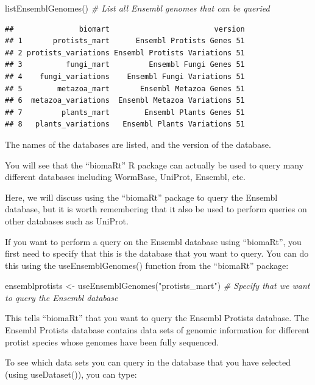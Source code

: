 \documentclass[
]{book}
\newenvironment{Shaded}{\begin{snugshade}}{\end{snugshade}}
\newcommand{\CommentTok}[1]{\textcolor[rgb]{0.56,0.35,0.01}{\textit{#1}}}
\newcommand{\FunctionTok}[1]{\textcolor[rgb]{0.00,0.00,0.00}{#1}}
\newcommand{\NormalTok}[1]{#1}
\newcommand{\OtherTok}[1]{\textcolor[rgb]{0.56,0.35,0.01}{#1}}
\newcommand{\StringTok}[1]{\textcolor[rgb]{0.31,0.60,0.02}{#1}}
\begin{document}
\begin{Shaded}
\begin{Highlighting}[]
\FunctionTok{listEnsemblGenomes}\NormalTok{()        }\CommentTok{\# List all Ensembl genomes that can be queried}
\end{Highlighting}
\end{Shaded}

\begin{verbatim}
##               biomart                        version
## 1       protists_mart      Ensembl Protists Genes 51
## 2 protists_variations Ensembl Protists Variations 51
## 3          fungi_mart         Ensembl Fungi Genes 51
## 4    fungi_variations    Ensembl Fungi Variations 51
## 5        metazoa_mart       Ensembl Metazoa Genes 51
## 6  metazoa_variations  Ensembl Metazoa Variations 51
## 7         plants_mart        Ensembl Plants Genes 51
## 8   plants_variations   Ensembl Plants Variations 51
\end{verbatim}

The names of the databases are listed, and the version of the database.

You will see that the ``biomaRt'' R package can actually be used to query many different databases including WormBase, UniProt, Ensembl, etc.

Here, we will discuss using the ``biomaRt'' package to query the Ensembl database, but it is worth remembering that it also be used to perform queries on other databases such as UniProt.

If you want to perform a query on the Ensembl database using ``biomaRt'', you first need to specify that this is the database that you want to query. You can do this using the useEnsemblGenomes() function from the ``biomaRt'' package:

\begin{Shaded}
\begin{Highlighting}[]
\NormalTok{ensemblprotists }\OtherTok{\textless{}{-}} \FunctionTok{useEnsemblGenomes}\NormalTok{(}\StringTok{"protists\_mart"}\NormalTok{) }\CommentTok{\# Specify that we want to query the Ensembl database}
\end{Highlighting}
\end{Shaded}

This tells ``biomaRt'' that you want to query the Ensembl Protists database. The Ensembl Protists database contains data sets of genomic information for different protist species whose genomes have been fully sequenced.

To see which data sets you can query in the database that you have selected (using useDataset()), you can type:
\end{document}
